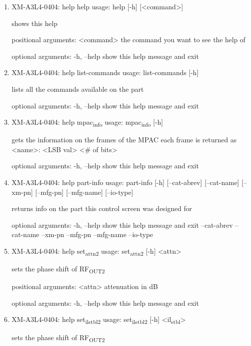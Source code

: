 \documentclass[11pt]{article}
\begin{document}
\begin{enumerate}
\item XM-A3L4-0404: help help
\label{sec:orgf1a67fa}
usage: help [-h] [<command>]

shows this help

positional arguments:
  <command>   the command you want to see the help of

optional arguments:
  -h, --help  show this help message and exit

\item XM-A3L4-0404: help list-commands
\label{sec:org7984921}
usage: list-commands [-h]

lists all the commands available on the part

optional arguments:
  -h, --help  show this help message and exit

\item XM-A3L4-0404: help mpac\textsubscript{info}
\label{sec:org5c400fc}
usage: mpac\textsubscript{info} [-h]

gets the information on the frames of the MPAC each frame is returned as
<name>: <LSB val> <\# of bits>

optional arguments:
  -h, --help  show this help message and exit

\item XM-A3L4-0404: help part-info
\label{sec:orgf293ffe}
usage: part-info  [-h] [--cat-abrev] [--cat-name] [--xm-pn] [--mfg-pn] [--mfg-name]
        [--io-type]

returns info on the part this control screen was designed for

optional arguments:
  -h, --help   show this help message and exit
  --cat-abrev
  --cat-name
  --xm-pn
  --mfg-pn
  --mfg-name
  --io-type

\item XM-A3L4-0404: help set\textsubscript{attn}\textsubscript{2}
\label{sec:orgffb54df}
usage: set\textsubscript{attn}\textsubscript{2} [-h] <attn>

sets the phase shift of RF\textsubscript{OUT2}

positional arguments:
  <attn>      attenuation in dB

optional arguments:
  -h, --help  show this help message and exit

\item XM-A3L4-0404: help set\textsubscript{il}\textsubscript{stbl}\textsubscript{2}
\label{sec:orgdd2cad2}
usage: set\textsubscript{il}\textsubscript{stbl}\textsubscript{2} [-h] <il\textsubscript{stbl}>

sets the phase shift of RF\textsubscript{OUT2}


\end{enumerate}
\end{document}
